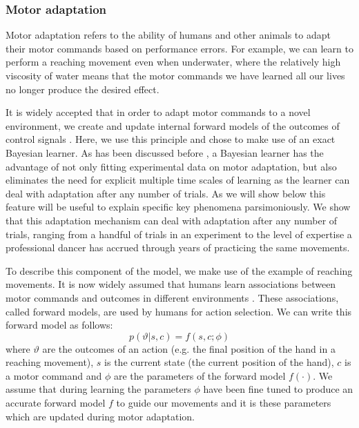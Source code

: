 \documentclass[a4paper,doc,floatsintext,natbib]{apa6}
\begin{document}
\subsubsection{Motor adaptation}
Motor adaptation refers to the ability of humans and other animals to adapt their motor commands based on performance errors. For example, we can learn to perform a reaching movement even when underwater, where the relatively high viscosity of water means that the motor commands we have learned all our lives no longer produce the desired effect.

It is widely accepted that in order to adapt motor commands to a novel environment, we create and update internal forward models of the outcomes of control signals \citep{Wolpert_Multiple_1998}. Here, we use this principle and chose to make use of an exact Bayesian learner. As has been discussed before \cite{Oh_Minimizing_2019}, a Bayesian learner has the advantage of not only fitting experimental data on motor adaptation, but also eliminates the need for explicit multiple time scales of learning as the learner can deal with adaptation after any number of trials. As we will show below this feature will be useful to explain specific key phenomena parsimoniously. We show that this adaptation mechanism can deal with adaptation after any number of trials, ranging from a handful of trials in an experiment to the level of expertise a professional dancer has accrued through years of practicing the same movements.

To describe this component of the model, we make use of the example of reaching movements. It is now widely assumed that humans learn associations between motor commands and outcomes in different environments \cite{Wolpert_Multiple_1998}. These associations, called forward models, are used by humans for action selection. We can write this forward model as follows:
\begin{equation}
p(\vartheta | s, c) = f(s, c; \phi) \label{eqn:forward-model}
\end{equation}
where $\vartheta$ are the outcomes of an action (e.g. the final position of the hand in a reaching movement), $s$ is the current state (the current position of the hand), $c$ is a motor command and $\phi$ are the parameters of the forward model $f(\cdot)$. We assume that during learning the parameters $\phi$ have been fine tuned to produce an accurate forward model $f$ to guide our movements and it is these parameters which are updated during motor adaptation.
\end{document}
